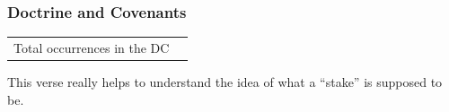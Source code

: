 						
						
						
						
		
	
		
		
	\subsubsection{Doctrine and Covenants} %
		\label{STAKE-DC}
	
		\begin{tabular}{ll}
			Total occurrences in the DC & 
		\end{tabular}
		
		\begin{compactdesc}
			\item[{\hyperref[DC96-1]{DC 96:1}}] \phantom{.}
				\begin{compactitem}
					\item This verse really helps to understand the idea of what a ``stake'' is supposed to be.
				\end{compactitem}
		\end{compactdesc}
		
